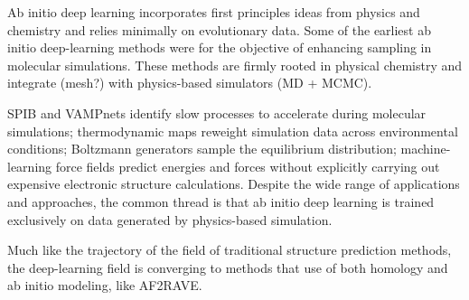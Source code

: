 \documentclass[%
 aip,
 amsmath,amssymb,
 reprint,%
]{revtex4-1}
\begin{document}
Ab initio deep learning incorporates first principles ideas from physics and chemistry and relies minimally on evolutionary data. Some of the earliest ab initio deep-learning methods were for the objective of enhancing sampling in molecular simulations. These methods are firmly rooted in physical chemistry and integrate (mesh?) with physics-based simulators (MD + MCMC).

SPIB and VAMPnets identify slow processes to accelerate during molecular simulations; thermodynamic maps reweight simulation data across environmental conditions; Boltzmann generators sample the equilibrium distribution; machine-learning force fields predict energies and forces without explicitly carrying out expensive electronic structure calculations. Despite the wide range of applications and approaches, the common thread is that ab initio deep learning is trained exclusively on data generated by physics-based simulation.

Much like the trajectory of the field of traditional structure prediction methods, the deep-learning field is converging to methods that use of both homology and ab initio modeling, like AF2RAVE.




\end{document}

